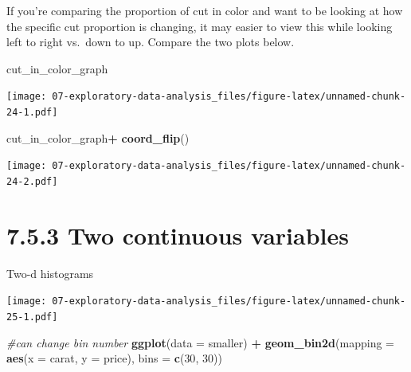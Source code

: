 \documentclass[]{book}
\newenvironment{Shaded}{\begin{snugshade}}{\end{snugshade}}
\newcommand{\CommentTok}[1]{\textcolor[rgb]{0.56,0.35,0.01}{\textit{#1}}}
\newcommand{\DataTypeTok}[1]{\textcolor[rgb]{0.13,0.29,0.53}{#1}}
\newcommand{\DecValTok}[1]{\textcolor[rgb]{0.00,0.00,0.81}{#1}}
\newcommand{\KeywordTok}[1]{\textcolor[rgb]{0.13,0.29,0.53}{\textbf{#1}}}
\newcommand{\NormalTok}[1]{#1}
\newcommand{\OperatorTok}[1]{\textcolor[rgb]{0.81,0.36,0.00}{\textbf{#1}}}
\newcommand{\StringTok}[1]{\textcolor[rgb]{0.31,0.60,0.02}{#1}}
\theoremstyle{definition}
\theoremstyle{definition}
\theoremstyle{definition}
\theoremstyle{remark}
\begin{document}
If you're comparing the proportion of cut in color and want to be
looking at how the specific cut proportion is changing, it may easier to
view this while looking left to right vs.~down to up. Compare the two
plots below.

\begin{Shaded}
\begin{Highlighting}[]
\NormalTok{cut_in_color_graph}
\end{Highlighting}
\end{Shaded}

\texttt{[image: 07-exploratory-data-analysis\_files/figure-latex/unnamed-chunk-24-1.pdf]}

\begin{Shaded}
\begin{Highlighting}[]
\NormalTok{cut_in_color_graph}\OperatorTok{+}
\StringTok{  }\KeywordTok{coord_flip}\NormalTok{()}
\end{Highlighting}
\end{Shaded}

\texttt{[image: 07-exploratory-data-analysis\_files/figure-latex/unnamed-chunk-24-2.pdf]}

\hypertarget{two-continuous-variables}{%
\section{7.5.3 Two continuous
variables}\label{two-continuous-variables}}

Two-d histograms

\begin{Shaded}
\end{Shaded}

\texttt{[image: 07-exploratory-data-analysis\_files/figure-latex/unnamed-chunk-25-1.pdf]}

\begin{Shaded}
\begin{Highlighting}[]
\CommentTok{#can change bin number}
\KeywordTok{ggplot}\NormalTok{(}\DataTypeTok{data =}\NormalTok{ smaller) }\OperatorTok{+}
\StringTok{  }\KeywordTok{geom_bin2d}\NormalTok{(}\DataTypeTok{mapping =} \KeywordTok{aes}\NormalTok{(}\DataTypeTok{x =}\NormalTok{ carat, }\DataTypeTok{y =}\NormalTok{ price), }\DataTypeTok{bins =} \KeywordTok{c}\NormalTok{(}\DecValTok{30}\NormalTok{, }\DecValTok{30}\NormalTok{))}
\end{Highlighting}
\end{Shaded}
\end{document}
